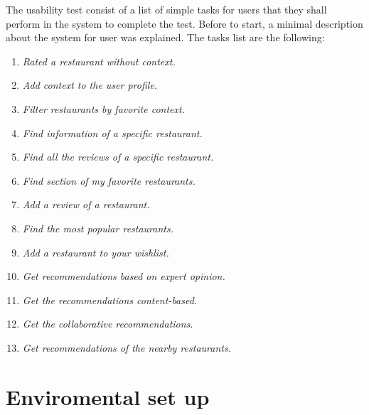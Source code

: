 The usability test consist of
a list of simple tasks for users that they shall perform in the system
to complete the test. Before to start, a minimal description about the
system for user was explained. The tasks list are the following:

\begin{enumerate} 
\item \textit{Rated a restaurant without context.}
\item \textit{Add context to the user profile.}
\item \textit{Filter restaurants by favorite context.}
\item \textit{Find information of a specific restaurant.}
\item \textit{Find all the reviews of a specific restaurant.} 
\item \textit{Find section of my favorite restaurants.}
\item \textit{Add a review of a restaurant.}
\item \textit{Find the most popular restaurants.}
\item \textit{Add a restaurant to your wishlist.}
\item \textit{Get recommendations based on expert opinion.} 
\item \textit{Get the recommendations content-based.}
\item \textit{Get the collaborative recommendations.}
\item \textit{Get recommendations of the nearby restaurants.}
\end{enumerate} 

\section{Enviromental set up}


